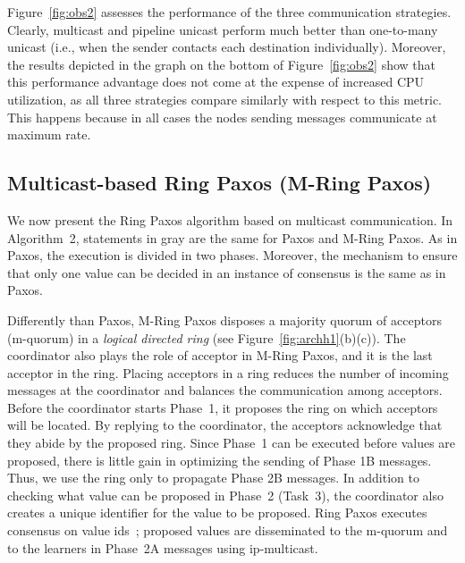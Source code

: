 \documentclass[final,3p,times,twocolumn,authoryear]{elsarticle}
\begin{document}
Figure~\ref{fig:obs2} assesses the performance of the three communication strategies. Clearly, multicast and pipeline unicast perform much better than one-to-many unicast (i.e., when the sender contacts each destination individually). Moreover, the results depicted in the graph on the bottom of Figure~\ref{fig:obs2} show that this performance advantage does not come at the expense of increased CPU utilization, as all three strategies compare similarly with respect to this metric. This happens because in all cases the nodes sending messages communicate at maximum rate.


\subsection{Multicast-based Ring Paxos (M-Ring Paxos)}
\label{sec:multirpaxos}

We now present the Ring Paxos algorithm based on multicast communication. In Algorithm~2, statements in gray are the same for Paxos and M-Ring Paxos. As in Paxos, the execution is divided in two phases. Moreover, the mechanism to ensure that only one value can be decided in an instance of consensus is the same as in Paxos.

Differently than Paxos, M-Ring Paxos disposes a majority quorum of acceptors (m-quorum) in a \emph{logical directed ring} (see Figure~\ref{fig:archh1}(b)(c)). The coordinator also plays the role of acceptor in M-Ring Paxos, and it is the last acceptor in the ring. Placing acceptors in a ring reduces the number of incoming messages at the coordinator and balances the communication among acceptors. Before the coordinator starts Phase~1, it proposes the ring on which acceptors will be located. By replying to the coordinator, the acceptors acknowledge that they abide by the proposed ring. Since Phase~1 can be executed before values are proposed, there is little gain in optimizing the sending of Phase 1B messages. Thus, we use the ring only to propagate Phase 2B messages. In addition to checking what value can be proposed in Phase~2 (Task~3), the coordinator also creates a unique identifier for the value to be proposed. Ring Paxos executes consensus on value ids~\cite{ESU04,LM04}; proposed values are disseminated to the m-quorum and to the learners in Phase~2A messages using ip-multicast.
\end{document}
